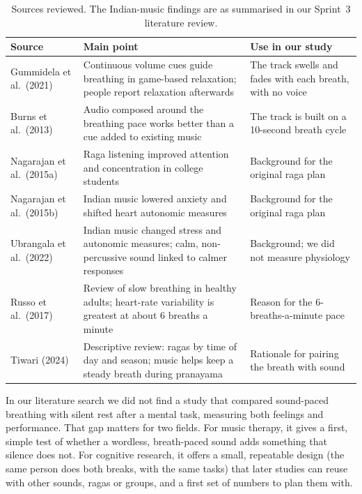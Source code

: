 \documentclass[11pt,a4paper]{article}
\begin{document}
\begin{table}[!htbp]
\centering\small
\caption{Sources reviewed. The Indian-music findings are as summarised in our Sprint~3 literature review.}
\label{tab:lit}
\begin{tabularx}{\textwidth}{>{\raggedright\arraybackslash}p{3.6cm}LL}
\toprule
\textbf{Source} & \textbf{Main point} & \textbf{Use in our study}\\
\midrule
Gummidela et al.\ (2021) & Continuous volume cues guide breathing in game-based relaxation; people report relaxation afterwards & The track swells and fades with each breath, with no voice\\
Burns et al.\ (2013) & Audio composed around the breathing pace works better than a cue added to existing music & The track is built on a 10-second breath cycle\\
Nagarajan et al.\ (2015a) & Raga listening improved attention and concentration in college students & Background for the original raga plan\\
Nagarajan et al.\ (2015b) & Indian music lowered anxiety and shifted heart autonomic measures & Background for the original raga plan\\
Ubrangala et al.\ (2022) & Indian music changed stress and autonomic measures; calm, non-percussive sound linked to calmer responses & Background; we did not measure physiology\\
Russo et al.\ (2017) & Review of slow breathing in healthy adults; heart-rate variability is greatest at about 6 breaths a minute & Reason for the 6-breaths-a-minute pace\\
Tiwari (2024) & Descriptive review: ragas by time of day and season; music helps keep a steady breath during pranayama & Rationale for pairing the breath with sound\\
\bottomrule
\end{tabularx}
\end{table}

\noindent In our literature search we did not find a study that compared sound-paced breathing with silent rest after a mental task, measuring both feelings and performance. That gap matters for two fields. For music therapy, it gives a first, simple test of whether a wordless, breath-paced sound adds something that silence does not. For cognitive research, it offers a small, repeatable design (the same person does both breaks, with the same tasks) that later studies can reuse with other sounds, ragas or groups, and a first set of numbers to plan them with.
\end{document}
